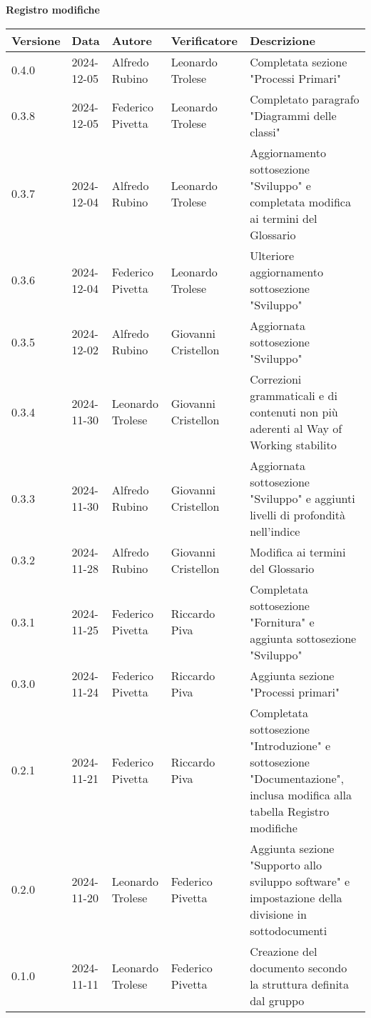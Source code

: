 
\begin{center}
\textbf{Registro modifiche}\\
\vspace{2mm}

\begin{tabularx}{\textwidth}{|l|l|l|l|X|}
\hline
\textbf{Versione} & \textbf{Data} & \textbf{Autore} & \textbf{Verificatore} & \textbf{Descrizione}\\
    \hline
    0.4.0 & 2024-12-05  & Alfredo Rubino & Leonardo Trolese & Completata sezione "Processi Primari"\\
    \hline
    0.3.8 & 2024-12-05  & Federico Pivetta & Leonardo Trolese & Completato paragrafo "Diagrammi delle classi"\\
    \hline
    0.3.7 & 2024-12-04  & Alfredo Rubino & Leonardo Trolese & Aggiornamento sottosezione "Sviluppo" e completata modifica ai termini del Glossario\\
    \hline
    0.3.6 & 2024-12-04  & Federico Pivetta & Leonardo Trolese & Ulteriore aggiornamento sottosezione "Sviluppo"\\
    \hline
    0.3.5 & 2024-12-02  & Alfredo Rubino & Giovanni Cristellon & Aggiornata sottosezione "Sviluppo"\\
    \hline
    0.3.4 & 2024-11-30  & Leonardo Trolese & Giovanni Cristellon & Correzioni grammaticali e di contenuti non più aderenti al Way of Working stabilito\\
    \hline
    0.3.3 & 2024-11-30  & Alfredo Rubino & Giovanni Cristellon & Aggiornata sottosezione "Sviluppo" e aggiunti livelli di profondità nell'indice\\
    \hline
    0.3.2 & 2024-11-28  & Alfredo Rubino & Giovanni Cristellon & Modifica ai termini del Glossario\\
    \hline
    0.3.1 & 2024-11-25  & Federico Pivetta & Riccardo Piva & Completata sottosezione "Fornitura" e aggiunta sottosezione "Sviluppo"\\
    \hline
    0.3.0 & 2024-11-24  & Federico Pivetta & Riccardo Piva & Aggiunta sezione "Processi primari"\\
    \hline
     0.2.1 & 2024-11-21  & Federico Pivetta  & Riccardo Piva & Completata sottosezione "Introduzione" e sottosezione "Documentazione", inclusa modifica alla tabella Registro modifiche\\
    \hline
    0.2.0 & 2024-11-20  & Leonardo Trolese & Federico Pivetta & Aggiunta sezione "Supporto allo sviluppo software" e impostazione della divisione in sottodocumenti\\
    \hline
    0.1.0 & 2024-11-11  & Leonardo Trolese & Federico Pivetta & Creazione del documento secondo la struttura definita dal gruppo\\
    \hline
\end{tabularx}
\end{center}